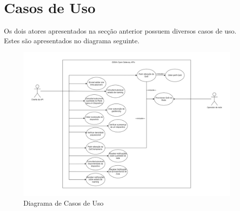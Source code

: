\section{Casos de Uso}

Os dois atores apresentados na secção anterior possuem diversos casos de uso. Estes são apresentados no diagrama seguinte.

\begin{figure}[H]
  \centerline{
    \includegraphics[width=20cm]{figs/use_case_diagram.png}
  }
  \caption{Diagrama de Casos de Uso}
\end{figure}

